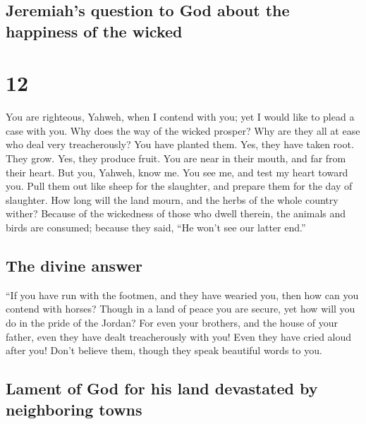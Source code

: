 \hypertarget{jeremiahs-question-to-god-about-the-happiness-of-the-wicked}{%
\subsection{Jeremiah's question to God about the happiness of the
wicked}\label{jeremiahs-question-to-god-about-the-happiness-of-the-wicked}}

\hypertarget{section-11}{%
\section{12}\label{section-11}}

 You are righteous, Yahweh, when I contend with you; yet I
would like to plead a case with you. Why does the way of the wicked
prosper? Why are they all at ease who deal very treacherously?
 You have planted them. Yes, they have taken root. They
grow. Yes, they produce fruit. You are near in their mouth, and far from
their heart.  But you, Yahweh, know me. You see me, and
test my heart toward you. Pull them out like sheep for the slaughter,
and prepare them for the day of slaughter.  How long will
the land mourn, and the herbs of the whole country wither? Because of
the wickedness of those who dwell therein, the animals and birds are
consumed; because they said, ``He won't see our latter end.''

\hypertarget{the-divine-answer}{%
\subsection{The divine answer}\label{the-divine-answer}}

 ``If you have run with the footmen, and they have wearied
you, then how can you contend with horses? Though in a land of peace you
are secure, yet how will you do in the pride of the Jordan?
 For even your brothers, and the house of your father,
even they have dealt treacherously with you! Even they have cried aloud
after you! Don't believe them, though they speak beautiful words to you.

\hypertarget{lament-of-god-for-his-land-devastated-by-neighboring-towns}{%
\subsection{Lament of God for his land devastated by neighboring
towns}\label{lament-of-god-for-his-land-devastated-by-neighboring-towns}}

